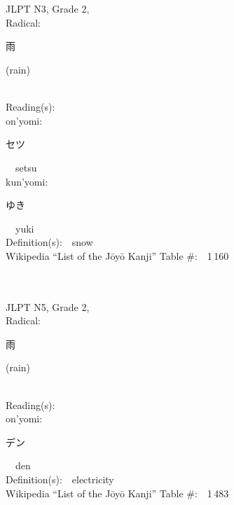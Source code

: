 \begin{multicols}{2}
\ \ \\
{\fontsize{34pt}{40pt}  }\ \ \\  %
{JLPT N3, Grade 2, \\Radical:\ \ {\begin{CJK}{UTF8}{min} 雨 \end{CJK}} (rain) } \\
Reading(s):\ \ \\
{\hspace*{1em}}on'yomi:\ \ \\
{\hspace*{2em}}{\begin{CJK}{UTF8}{min} セツ \end{CJK}}\ \ setsu\ \ \\
{\hspace*{1em}}kun'yomi:\ \ \\
{\hspace*{2em}}{\begin{CJK}{UTF8}{min} ゆき \end{CJK}}\ \ yuki\ \ \\
Definition(s):\ \ snow \\
Wikipedia ``List of the J\=oy\=o Kanji'' Table \#:\ \ 1\,160 \\
\ \ \\
{\fontsize{34pt}{40pt}  }\ \ \\  %
{JLPT N5, Grade 2, \\Radical:\ \ {\begin{CJK}{UTF8}{min} 雨 \end{CJK}} (rain) } \\
Reading(s):\ \ \\
{\hspace*{1em}}on'yomi:\ \ \\
{\hspace*{2em}}{\begin{CJK}{UTF8}{min} デン \end{CJK}}\ \ den\ \ \\
Definition(s):\ \ electricity \\
Wikipedia ``List of the J\=oy\=o Kanji'' Table \#:\ \ 1\,483 \\

\end{multicols}

